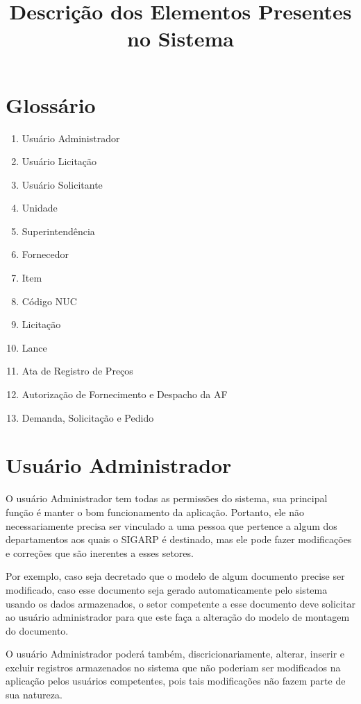 \documentclass[ ]{article}
\title{Descrição dos Elementos Presentes no Sistema}
\date{}
\author{}
\begin{document}
\maketitle
\newpage
\section*{Glossário}
	\begin{enumerate}
		\item Usuário Administrador
		\item Usuário Licitação
		\item Usuário Solicitante
		\item Unidade
		\item Superintendência
		\item Fornecedor
		\item Item
		\item Código NUC
		\item Licitação
		\item Lance
		\item Ata de Registro de Preços
		\item Autorização de Fornecimento e Despacho da AF
		\item Demanda, Solicitação e Pedido
	\end{enumerate}
\newpage
	
\section{Usuário Administrador}
	O usuário Administrador tem todas as permissões do sistema, sua principal função é manter o bom funcionamento da aplicação. Portanto, ele não necessariamente precisa ser vinculado a uma pessoa que pertence a algum dos departamentos aos quais o SIGARP é destinado, mas ele pode fazer modificações e correções que são inerentes a esses setores.

	Por exemplo, caso seja decretado que o modelo de algum documento precise ser modificado, caso esse documento seja gerado automaticamente pelo sistema usando os dados armazenados, o setor competente a esse documento deve solicitar ao usuário administrador para que este faça a alteração do modelo de montagem do documento.
	
	O usuário Administrador poderá também, discricionariamente, alterar, inserir e excluir registros armazenados no sistema que não poderiam ser modificados na aplicação pelos usuários competentes, pois tais modificações não fazem parte de sua natureza.
\end{document}
